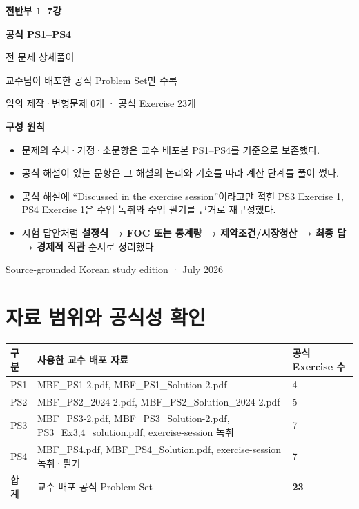 \documentclass[10.5pt,a4paper]{article}
\begin{document}
\begin{titlepage}
\thispagestyle{empty}
\vspace*{22mm}
{\color{navy}\Huge\bfseries 전반부 1--7강}\par
\vspace{3mm}
{\color{blue}\fontsize{28}{34}\selectfont\bfseries 공식 PS1--PS4\par 전 문제 상세풀이}\par
\vspace{9mm}
{\Large 교수님이 배포한 공식 Problem Set만 수록}\par
\vspace{3mm}
{\large 임의 제작·변형문제 0개 · 공식 Exercise 23개}\par
\vfill
\begin{tcolorbox}[colback=lightgray,colframe=navy,boxrule=0.8pt,arc=2mm,left=5mm,right=5mm,top=4mm,bottom=4mm]
\textbf{구성 원칙}
\begin{itemize}
\item 문제의 수치·가정·소문항은 교수 배포본 PS1--PS4를 기준으로 보존했다.
\item 공식 해설이 있는 문항은 그 해설의 논리와 기호를 따라 계산 단계를 풀어 썼다.
\item 공식 해설에 ``Discussed in the exercise session''이라고만 적힌 PS3 Exercise 1, PS4 Exercise 1은 수업 녹취와 수업 필기를 근거로 재구성했다.
\item 시험 답안처럼 \textbf{설정식 → FOC 또는 통계량 → 제약조건/시장청산 → 최종 답 → 경제적 직관} 순서로 정리했다.
\end{itemize}
\end{tcolorbox}
\vfill
{\small\color{graytext}Source-grounded Korean study edition · July 2026}\par
\end{titlepage}

\tableofcontents
\clearpage

\section*{자료 범위와 공식성 확인}
\begin{sourcebox}
\begin{tabularx}{\textwidth}{@{}lXl@{}}
\toprule
구분 & 사용한 교수 배포 자료 & 공식 Exercise 수 \\
\midrule
PS1 & MBF\_PS1-2.pdf, MBF\_PS1\_Solution-2.pdf & 4 \\
PS2 & MBF\_PS2\_2024-2.pdf, MBF\_PS2\_Solution\_2024-2.pdf & 5 \\
PS3 & MBF\_PS3-2.pdf, MBF\_PS3\_Solution-2.pdf, PS3\_Ex3,4\_solution.pdf, exercise-session 녹취 & 7 \\
PS4 & MBF\_PS4.pdf, MBF\_PS4\_Solution.pdf, exercise-session 녹취·필기 & 7 \\
\midrule
합계 & 교수 배포 공식 Problem Set & \textbf{23} \\
\bottomrule
\end{tabularx}
\end{sourcebox}
\end{document}
